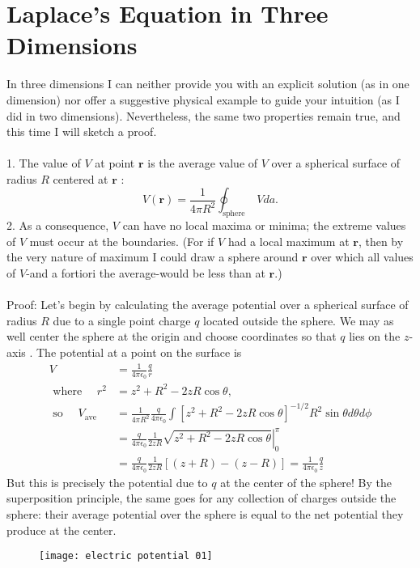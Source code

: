 \section{Laplace's Equation in Three Dimensions}
In three dimensions I can neither provide you with an explicit solution (as in one dimension) nor offer a suggestive physical example to guide your intuition (as I did in two dimensions). Nevertheless, the same two properties remain true, and this time I will sketch a proof.\\\\
1. The value of $V$ at point $\mathbf{r}$ is the average value of $V$ over a spherical surface of radius $R$ centered at $\mathbf{r}$ :
$$
V(\mathbf{r})=\frac{1}{4 \pi R^{2}} \oint_{\text {sphere }} V d a .
$$
2. As a consequence, $V$ can have no local maxima or minima; the extreme values of $V$ must occur at the boundaries. (For if $V$ had a local maximum at $\mathbf{r}$, then by the very nature of maximum I could draw a sphere around $\mathbf{r}$ over which all values of $V$-and a fortiori the average-would be less than at $\mathbf{r}$.)\\\\
Proof: Let's begin by calculating the average potential over a spherical surface of radius $R$ due to a single point charge $q$ located outside the sphere. We may as well center the sphere at the origin and choose coordinates so that $q$ lies on the $z$-axis . The potential at a point on the surface is
\begin{align*}
V&=\frac{1}{4 \pi \epsilon_{0}} \frac{q}{r}\\
\text{ where }\quad
r^{2}&=z^{2}+R^{2}-2 z R \cos \theta,\\
\text{ so }\quad
V_{\text {ave }} &=\frac{1}{4 \pi R^{2}} \frac{q}{4 \pi \epsilon_{0}} \int\left[z^{2}+R^{2}-2 z R \cos \theta\right]^{-1 / 2} R^{2} \sin \theta d \theta d \phi \\
&=\left.\frac{q}{4 \pi \epsilon_{0}} \frac{1}{2 z R} \sqrt{z^{2}+R^{2}-2 z R \cos \theta}\right|_{0} ^{\pi} \\
&=\frac{q}{4 \pi \epsilon_{0}} \frac{1}{2 z R}[(z+R)-(z-R)]=\frac{1}{4 \pi \epsilon_{0}} \frac{q}{z}
\end{align*}
But this is precisely the potential due to $q$ at the center of the sphere! By the superposition principle, the same goes for any collection of charges outside the sphere: their average potential over the sphere is equal to the net potential they produce at the center. 
\begin{figure}[H]
	\centering
	\texttt{[image: electric potential 01]}
	\caption{}
	\label{}
\end{figure}
